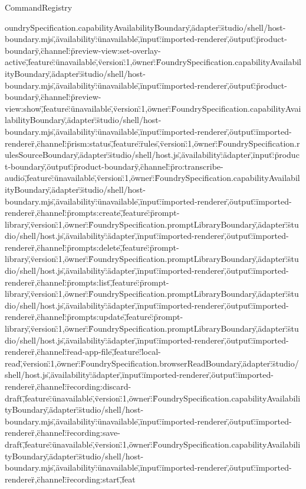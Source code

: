 \begin{lexlean}{CommandRegistry}
\begin{semanticmodule}
{oundrySpecification.capabilityAvailabilityBoundary\",\"adapter\":\"studio/shell/host-boundary.mjs\",\"availability\":\"unavailable\",\"input\":\"imported-renderer\",\"output\":\"product-boundary\"},{\"channel\":\"preview-view:set-overlay-active\",\"feature\":\"unavailable\",\"version\":1,\"owner\":\"FoundrySpecification.capabilityAvailabilityBoundary\",\"adapter\":\"studio/shell/host-boundary.mjs\",\"availability\":\"unavailable\",\"input\":\"imported-renderer\",\"output\":\"product-boundary\"},{\"channel\":\"preview-view:show\",\"feature\":\"unavailable\",\"version\":1,\"owner\":\"FoundrySpecification.capabilityAvailabilityBoundary\",\"adapter\":\"studio/shell/host-boundary.mjs\",\"availability\":\"unavailable\",\"input\":\"imported-renderer\",\"output\":\"imported-renderer\"},{\"channel\":\"prism:status\",\"feature\":\"rules\",\"version\":1,\"owner\":\"FoundrySpecification.rulesSourceBoundary\",\"adapter\":\"studio/shell/host.js\",\"availability\":\"adapter\",\"input\":\"product-boundary\",\"output\":\"product-boundary\"},{\"channel\":\"pro:transcribe-audio\",\"feature\":\"unavailable\",\"version\":1,\"owner\":\"FoundrySpecification.capabilityAvailabilityBoundary\",\"adapter\":\"studio/shell/host-boundary.mjs\",\"availability\":\"unavailable\",\"input\":\"imported-renderer\",\"output\":\"imported-renderer\"},{\"channel\":\"prompts:create\",\"feature\":\"prompt-library\",\"version\":1,\"owner\":\"FoundrySpecification.promptLibraryBoundary\",\"adapter\":\"studio/shell/host.js\",\"availability\":\"adapter\",\"input\":\"imported-renderer\",\"output\":\"imported-renderer\"},{\"channel\":\"prompts:delete\",\"feature\":\"prompt-library\",\"version\":1,\"owner\":\"FoundrySpecification.promptLibraryBoundary\",\"adapter\":\"studio/shell/host.js\",\"availability\":\"adapter\",\"input\":\"imported-renderer\",\"output\":\"imported-renderer\"},{\"channel\":\"prompts:list\",\"feature\":\"prompt-library\",\"version\":1,\"owner\":\"FoundrySpecification.promptLibraryBoundary\",\"adapter\":\"studio/shell/host.js\",\"availability\":\"adapter\",\"input\":\"imported-renderer\",\"output\":\"imported-renderer\"},{\"channel\":\"prompts:update\",\"feature\":\"prompt-library\",\"version\":1,\"owner\":\"FoundrySpecification.promptLibraryBoundary\",\"adapter\":\"studio/shell/host.js\",\"availability\":\"adapter\",\"input\":\"imported-renderer\",\"output\":\"imported-renderer\"},{\"channel\":\"read-app-file\",\"feature\":\"local-read\",\"version\":1,\"owner\":\"FoundrySpecification.browserReadBoundary\",\"adapter\":\"studio/shell/host.js\",\"availability\":\"adapter\",\"input\":\"imported-renderer\",\"output\":\"imported-renderer\"},{\"channel\":\"recording:discard-draft\",\"feature\":\"unavailable\",\"version\":1,\"owner\":\"FoundrySpecification.capabilityAvailabilityBoundary\",\"adapter\":\"studio/shell/host-boundary.mjs\",\"availability\":\"unavailable\",\"input\":\"imported-renderer\",\"output\":\"imported-renderer\"},{\"channel\":\"recording:save-draft\",\"feature\":\"unavailable\",\"version\":1,\"owner\":\"FoundrySpecification.capabilityAvailabilityBoundary\",\"adapter\":\"studio/shell/host-boundary.mjs\",\"availability\":\"unavailable\",\"input\":\"imported-renderer\",\"output\":\"imported-renderer\"},{\"channel\":\"recording:start\",\"feat}
\end{semanticmodule}
\end{lexlean}
